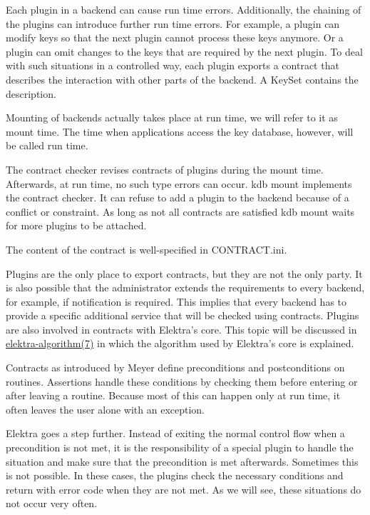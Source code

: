 Each plugin in a backend can cause run time errors. Additionally, the chaining of the plugins can introduce further run time errors. For example, a plugin can modify keys so that the next plugin cannot process these keys anymore. Or a plugin can omit changes to the keys that are required by the next plugin. To deal with such situations in a controlled way, each plugin exports a contract that describes the interaction with other parts of the backend. A {\ttfamily Key\+Set} contains the description.

Mounting of backends actually takes place at run time, we will refer to it as mount time. The time when applications access the key database, however, will be called run time.

The contract checker revises contracts of plugins during the mount time. Afterwards, at run time, no such type errors can occur. {\ttfamily kdb mount} implements the contract checker. It can refuse to add a plugin to the backend because of a conflict or constraint. As long as not all contracts are satisfied {\ttfamily kdb mount} waits for more plugins to be attached.

The content of the contract is well-\/specified in C\+O\+N\+T\+R\+A\+C\+T.ini.

Plugins are the only place to export contracts, but they are not the only party. It is also possible that the administrator extends the requirements to every backend, for example, if notification is required. This implies that every backend has to provide a specific additional service that will be checked using contracts. Plugins are also involved in contracts with Elektra's core. This topic will be discussed in \hyperlink{md_doc_help_elektra-algorithm_doc_help_elektra-algorithm_md}{elektra-\/algorithm(7)} in which the algorithm used by Elektra's core is explained.

Contracts as introduced by Meyer define preconditions and postconditions on routines. Assertions handle these conditions by checking them before entering or after leaving a routine. Because most of this can happen only at run time, it often leaves the user alone with an exception.

Elektra goes a step further. Instead of exiting the normal control flow when a precondition is not met, it is the responsibility of a special plugin to handle the situation and make sure that the precondition is met afterwards. Sometimes this is not possible. In these cases, the plugins check the necessary conditions and return with error code when they are not met. As we will see, these situations do not occur very often.

